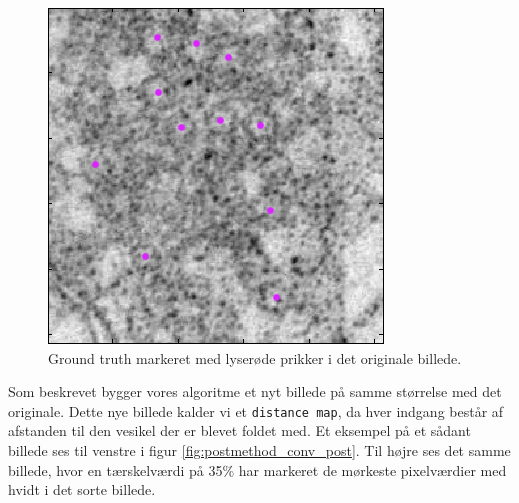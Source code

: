 \begin{figure}[H]
		\centering
		\includegraphics[scale=0.65]{files/postmethod/img/ground_truth.png}
	\caption{Ground truth markeret med lyserøde prikker i det originale billede.\label{fig:postmethod_conv_gt}}
\end{figure}

Som beskrevet bygger vores algoritme et nyt billede på samme størrelse med det originale. Dette nye billede kalder vi et \texttt{distance map}, da hver indgang består af afstanden til den vesikel der er blevet foldet med. Et eksempel på et sådant billede ses til venstre i figur \ref{fig:postmethod_conv_post}. Til højre ses det samme billede, hvor en tærskelværdi på 35\% har markeret de mørkeste pixelværdier med hvidt i det sorte billede.

